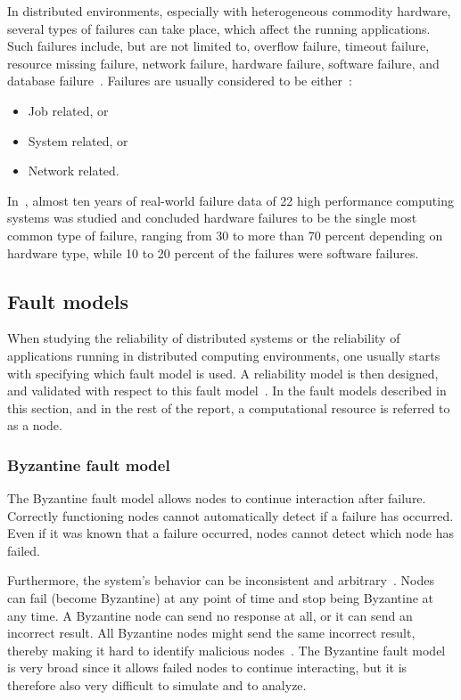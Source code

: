 \documentclass{cslthse-msc}
\begin{document}
In distributed environments, especially with heterogeneous commodity hardware, several types of failures can take place, which affect the running applications. Such failures include, but are not limited to, overflow failure, timeout failure, resource missing failure, network failure, hardware failure, software failure, and database failure~\cite{cloudServiceRel}. Failures are usually considered to be either~\cite{evalOfGridRel}:

\begin{itemize}
	\item Job related, or
	\item System related, or
	\item Network related.
\end{itemize}

In~\cite{studyOfFailures}, almost ten years of real-world failure data of 22 high performance computing systems was studied and concluded hardware failures to be the single most common type of failure, ranging from 30 to more than 70 percent depending on hardware type, while 10 to 20 percent of the failures were software failures.

\subsection{Fault models} \label{subsec:background_fault_models}
When studying the reliability of distributed systems or the reliability of applications running in distributed computing environments, one usually starts with specifying which fault model is used. A reliability model is then designed, and validated with respect to this fault model~\cite{faultTolerantFundamentals}. In the fault models described in this section, and in the rest of the report, a computational resource is referred to as a node.

\subsubsection{Byzantine fault model} \label{subsub:background_byzantine}
The Byzantine fault model allows nodes to continue interaction after failure. Correctly functioning nodes cannot automatically detect if a failure has occurred. Even if it was known that a failure occurred, nodes cannot detect which node has failed. 

Furthermore, the system's behavior can be inconsistent and arbitrary~\cite{surveyFaultParallel}. Nodes can fail (become Byzantine) at any point of time and stop being Byzantine at any time. A Byzantine node can send no response at all, or it can send an incorrect result. All Byzantine nodes might send the same incorrect result, thereby making it hard to identify malicious nodes~\cite{selfAdaptRel}. %
The Byzantine fault model is very broad since it allows failed nodes to continue interacting, but it is therefore also very difficult to simulate and to analyze.
\end{document}
